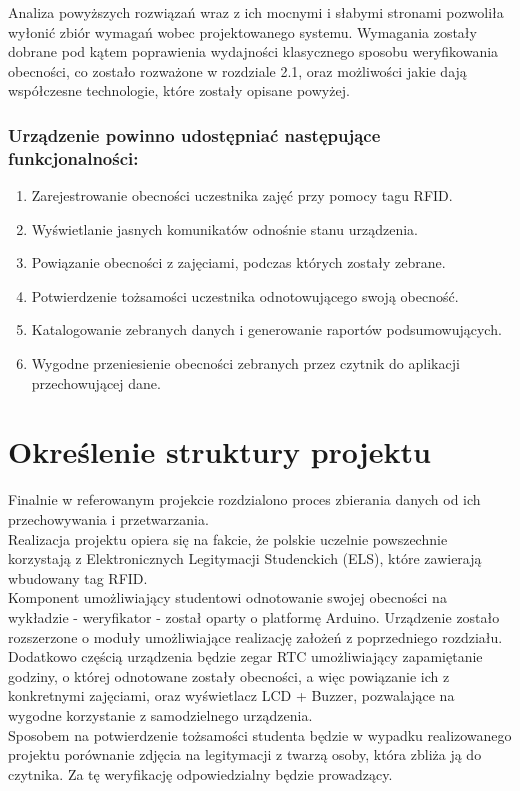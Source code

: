 \documentclass[declaration,shortabstract, mgr]{iithesis}
\begin{document}
\indent Analiza powyższych rozwiązań wraz z ich mocnymi i słabymi stronami pozwoliła wyłonić zbiór wymagań wobec projektowanego systemu. Wymagania zostały dobrane pod kątem poprawienia wydajności klasycznego sposobu weryfikowania obecności, co zostało rozważone w rozdziale 2.1, oraz możliwości jakie dają współczesne technologie, które zostały opisane powyżej.

\subsubsection{Urządzenie powinno udostępniać następujące funkcjonalności:}

\begin{enumerate}
\item Zarejestrowanie obecności uczestnika zajęć przy pomocy tagu RFID.
\item Wyświetlanie jasnych komunikatów odnośnie stanu urządzenia.
\item Powiązanie obecności z zajęciami, podczas których zostały zebrane.
\item Potwierdzenie tożsamości uczestnika odnotowującego swoją obecność.
\item Katalogowanie zebranych danych i generowanie raportów podsumowujących.
\item Wygodne przeniesienie obecności zebranych przez czytnik do aplikacji przechowującej dane.
\end{enumerate}



\section{Określenie struktury projektu}
\indent Finalnie w referowanym projekcie rozdzialono proces zbierania danych od ich przechowywania i przetwarzania.\\
\indent Realizacja projektu opiera się na fakcie, że polskie uczelnie powszechnie korzystają z Elektronicznych Legitymacji Studenckich (ELS), które zawierają wbudowany tag RFID. \\
\indent Komponent umożliwiający studentowi odnotowanie swojej obecności na wykładzie - weryfikator - został oparty o platformę Arduino. Urządzenie zostało rozszerzone o moduły umożliwiające realizację założeń z poprzedniego rozdziału.\\
\indent Dodatkowo częścią urządzenia będzie zegar RTC umożliwiający zapamiętanie godziny, o której odnotowane zostały obecności, a więc powiązanie ich z konkretnymi zajęciami, oraz wyświetlacz LCD + Buzzer, pozwalające na wygodne korzystanie z samodzielnego urządzenia. \\
\indent Sposobem na potwierdzenie tożsamości studenta będzie w wypadku realizowanego projektu porównanie zdjęcia na legitymacji z twarzą osoby, która zbliża ją do czytnika. Za tę weryfikację odpowiedzialny będzie prowadzący.\\\\
\end{document}
